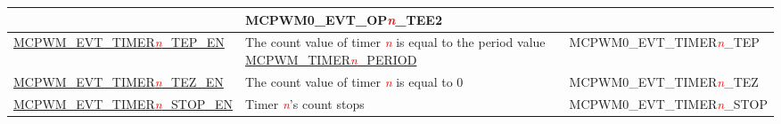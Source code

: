\begin{ThreePartTable}
\begin{longtable}[c]{| l | L{7cm} | l |}
    & MCPWM0\_EVT\_OP\textcolor{red}{\it{n}}\_TEE2    \\\hline
    \hyperref[fielddesc:MCPWMEVTTIMER0TEPEN]{MCPWM\_EVT\_TIMER\textcolor{red}{\it{n}}\_TEP\_EN}
    & The count value of timer \textcolor{red}{\it{n}} is equal to the period value \hyperref[fielddesc:MCPWMTIMERNPERIOD]{MCPWM\_TIMER\textcolor{red}{\it{n}}\_PERIOD}
    & MCPWM0\_EVT\_TIMER\textcolor{red}{\it{n}}\_TEP    \\\hline
    \hyperref[fielddesc:MCPWMEVTTIMER0TEZEN]{MCPWM\_EVT\_TIMER\textcolor{red}{\it{n}}\_TEZ\_EN}
    & The count value of timer \textcolor{red}{\it{n}} is equal to 0
    & MCPWM0\_EVT\_TIMER\textcolor{red}{\it{n}}\_TEZ    \\\hline
    \hyperref[fielddesc:MCPWMEVTTIMER0STOPEN]{MCPWM\_EVT\_TIMER\textcolor{red}{\it{n}}\_STOP\_EN}
    & Timer \textcolor{red}{\it{n}}'s count stops
    & MCPWM0\_EVT\_TIMER\textcolor{red}{\it{n}}\_STOP    \\\hline
\end{longtable}
\end{ThreePartTable}